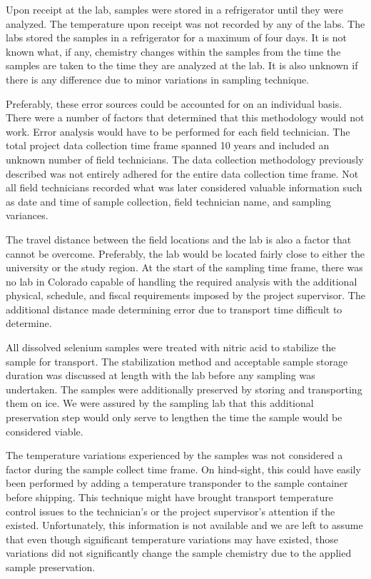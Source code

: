 \begin{linenumbers}
Upon receipt at the lab, samples were stored in a refrigerator until they were analyzed.  The temperature upon receipt was not recorded by any of the labs.  The labs stored the samples in a refrigerator for a maximum of four days.  It is not known what, if any, chemistry changes within the samples from the time the samples are taken to the time they are analyzed at the lab.  It is also unknown if there is any difference due to minor variations in sampling technique.

Preferably, these error sources could be accounted for on an individual basis.  There were a number of factors that determined that this methodology would not work.  Error analysis would have to be performed for each field technician.  The total project data collection time frame spanned 10 years and included an unknown number of field technicians.  The data collection methodology previously described was not entirely adhered for the entire data collection time frame.  Not all field technicians recorded what was later considered valuable information such as date and time of sample collection, field technician name, and sampling variances.

The travel distance between the field locations and the lab is also a factor that cannot be overcome.  Preferably, the lab would be located fairly close to either the university or the study region.  At the start of the sampling time frame, there was no lab in Colorado capable of handling the required analysis with the additional physical, schedule, and fiscal requirements imposed by the project supervisor.  The additional distance made determining error due to transport time difficult to determine.

All dissolved selenium samples were treated with nitric acid to stabilize the sample for transport.  The stabilization method and acceptable sample storage duration was discussed at length with the lab before any sampling was undertaken.  The samples were additionally preserved by storing and transporting them on ice.  We were assured by the sampling lab that this additional preservation step would only serve to lengthen the time the sample would be considered viable.

The temperature variations experienced by the samples was not considered a factor during the sample collect time frame.  On hind-sight, this could have easily been performed by adding a temperature transponder to the sample container before shipping.  This technique might have brought transport temperature control issues to the technician's or the project supervisor's attention if the existed.  Unfortunately, this information is not available and we are left to assume that even though significant temperature variations may have existed, those variations did not significantly change the sample chemistry due to the applied sample preservation.


\end{linenumbers}
